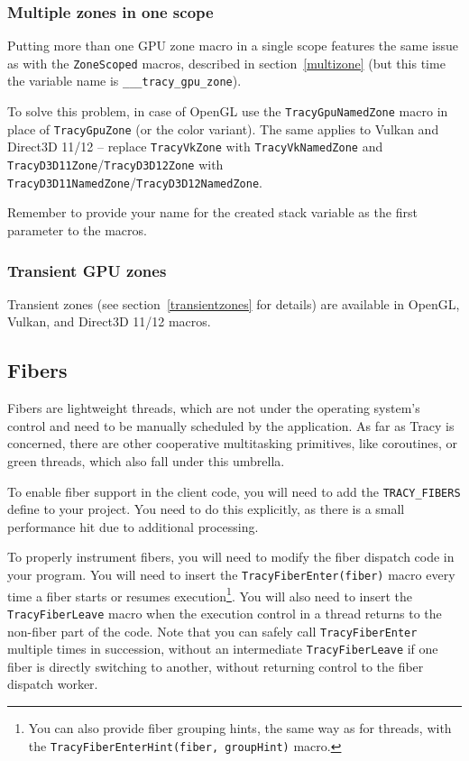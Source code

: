 \documentclass[hidelinks,titlepage,a4paper,twoside]{article}
\begin{document}
\subsubsection{Multiple zones in one scope}

Putting more than one GPU zone macro in a single scope features the same issue as with the \texttt{ZoneScoped} macros, described in section~\ref{multizone} (but this time the variable name is \texttt{\_\_\_tracy\_gpu\_zone}).

To solve this problem, in case of OpenGL use the \texttt{TracyGpuNamedZone} macro in place of \texttt{TracyGpuZone} (or the color variant). The same applies to Vulkan and Direct3D 11/12 -- replace \texttt{TracyVkZone} with \texttt{TracyVkNamedZone} and \texttt{TracyD3D11Zone}/\texttt{TracyD3D12Zone} with \texttt{TracyD3D11NamedZone}/\texttt{TracyD3D12NamedZone}.

Remember to provide your name for the created stack variable as the first parameter to the macros.

\subsubsection{Transient GPU zones}

Transient zones (see section~\ref{transientzones} for details) are available in OpenGL, Vulkan, and Direct3D 11/12 macros.

\subsection{Fibers}
\label{fibers}

Fibers are lightweight threads, which are not under the operating system's control and need to be manually scheduled by the application. As far as Tracy is concerned, there are other cooperative multitasking primitives, like coroutines, or green threads, which also fall under this umbrella.

To enable fiber support in the client code, you will need to add the \texttt{TRACY\_FIBERS} define to your project. You need to do this explicitly, as there is a small performance hit due to additional processing.

To properly instrument fibers, you will need to modify the fiber dispatch code in your program. You will need to insert the \texttt{TracyFiberEnter(fiber)} macro every time a fiber starts or resumes execution\footnote{You can also provide fiber grouping hints, the same way as for threads, with the \texttt{TracyFiberEnterHint(fiber, groupHint)} macro.}. You will also need to insert the \texttt{TracyFiberLeave} macro when the execution control in a thread returns to the non-fiber part of the code. Note that you can safely call \texttt{TracyFiberEnter} multiple times in succession, without an intermediate \texttt{TracyFiberLeave} if one fiber is directly switching to another, without returning control to the fiber dispatch worker.
\end{document}
